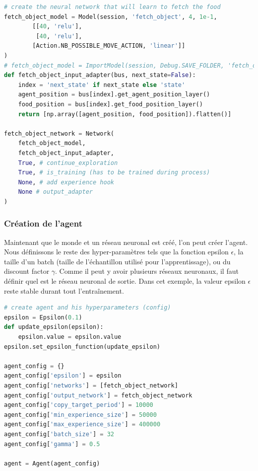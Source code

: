 \documentclass[11pt,a4paper]{report}
\begin{document}
  \begin{lstlisting}[language=python]
# create the neural network that will learn to fetch the food
fetch_object_model = Model(session, 'fetch_object', 4, 1e-1,
        [[40, 'relu'],
         [40, 'relu'],
        [Action.NB_POSSIBLE_MOVE_ACTION, 'linear']]
)
# fetch_object_model = ImportModel(session, Debug.SAVE_FOLDER, 'fetch_object')
def fetch_object_input_adapter(bus, next_state=False):
    index = 'next_state' if next_state else 'state'
    agent_position = bus[index].get_agent_position_layer()
    food_position = bus[index].get_food_position_layer()
    return [np.array([agent_position, food_position]).flatten()]

fetch_object_network = Network(
    fetch_object_model,
    fetch_object_input_adapter,
    True, # continue_exploration
    True, # is_training (has to be trained during process)
    None, # add experience hook
    None # output_adapter
)
  \end{lstlisting}  
  
  \subsubsection{Création de l'agent} 
  
  \par Maintenant que le monde et un réseau neuronal est créé, l'on peut créer l'agent. Nous définissons le reste des hyper-paramètres tels que la fonction epsilon $\epsilon$, la taille d'un batch (taille de l'échantillon utilisé pour l'apprentissage), ou du discount factor $\gamma$. Comme il peut y avoir plusieurs réseaux neuronaux, il faut définir quel est le réseau neuronal de sortie. Dans cet exemple, la valeur epsilon $\epsilon$ reste stable durant tout l’entraînement. 

  \begin{lstlisting}[language=python]
# create agent and his hyperparameters (config)
epsilon = Epsilon(0.1)
def update_epsilon(epsilon):
    epsilon.value = epsilon.value
epsilon.set_epsilon_function(update_epsilon)

agent_config = {}
agent_config['epsilon'] = epsilon
agent_config['networks'] = [fetch_object_network]
agent_config['output_network'] = fetch_object_network
agent_config['copy_target_period'] = 10000
agent_config['min_experience_size'] = 50000
agent_config['max_experience_size'] = 400000
agent_config['batch_size'] = 32
agent_config['gamma'] = 0.5

agent = Agent(agent_config)
  \end{lstlisting} 
\end{document}
